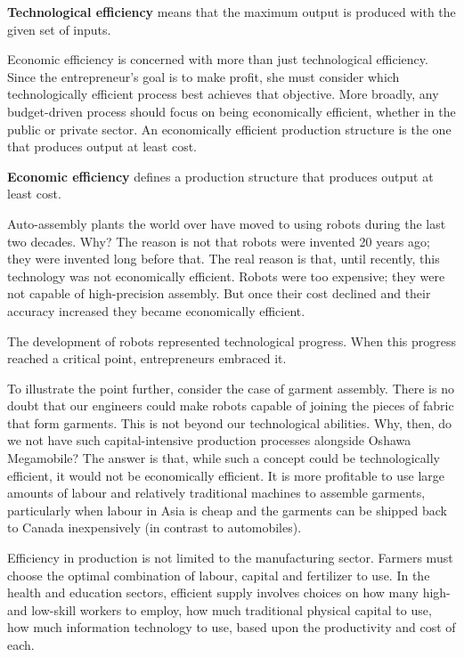 \begin{DefBox}
\textbf{Technological efficiency} means that the maximum output is produced with the given set of inputs.
\end{DefBox}

Economic efficiency is concerned with more than just technological efficiency. Since the entrepreneur's goal is to make profit, she must consider which technologically efficient process best achieves that objective. More broadly, any budget-driven process should focus on being economically efficient, whether in the public or private sector. An economically efficient production structure is the one that produces output at least cost. 

\begin{DefBox}
\textbf{Economic efficiency} defines a production structure that produces output at least cost.
\end{DefBox}

Auto-assembly plants the world over have moved to using robots during the last two decades. Why? The reason is not that robots were invented 20 years ago; they were invented long before that. The real reason is that, until recently, this technology was not economically efficient. Robots were too expensive; they were not capable of high-precision assembly. But once their cost declined and their accuracy increased they became economically efficient. 

The development of robots represented technological progress. When this progress reached a critical point, entrepreneurs embraced it.

To illustrate the point further, consider the case of garment assembly. There is no doubt that our engineers could make robots capable of joining the pieces of fabric that form garments. This is not beyond our technological abilities. Why, then, do we not have such capital-intensive production processes alongside Oshawa Megamobile? The answer is that, while such a concept could be technologically efficient, it would not be economically efficient. It is more profitable to use large amounts of labour and relatively traditional machines to assemble garments, particularly when labour in Asia is cheap and the garments can be shipped back to Canada inexpensively (in contrast to automobiles).

Efficiency in production is not limited to the manufacturing sector. Farmers must choose the optimal combination of labour, capital and fertilizer to use. In the health and education sectors, efficient supply involves choices on how many high- and low-skill workers to employ, how much traditional physical capital to use, how much information technology to use, based upon the productivity and cost of each.